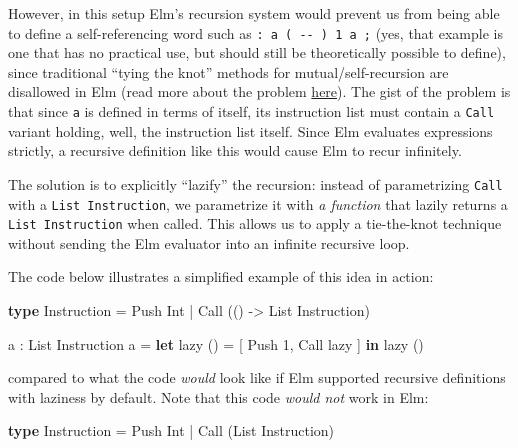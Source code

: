 \documentclass[
]{article}
\newenvironment{Shaded}{}{}
\newcommand{\DataTypeTok}[1]{\textcolor[rgb]{0.56,0.13,0.00}{#1}}
\newcommand{\DecValTok}[1]{\textcolor[rgb]{0.25,0.63,0.44}{#1}}
\newcommand{\FunctionTok}[1]{\textcolor[rgb]{0.02,0.16,0.49}{#1}}
\newcommand{\KeywordTok}[1]{\textcolor[rgb]{0.00,0.44,0.13}{\textbf{#1}}}
\newcommand{\NormalTok}[1]{#1}
\newcommand{\OperatorTok}[1]{\textcolor[rgb]{0.40,0.40,0.40}{#1}}
\begin{document}
\begin{itemize}
\begin{itemize}
\begin{itemize}
      However, in this setup Elm's recursion system would prevent us
      from being able to define a self-referencing word such as
      \texttt{:\ a\ (\ -\/-\ )\ 1\ a\ ;} (yes, that example is one that
      has no practical use, but should still be theoretically possible
      to define), since traditional ``tying the knot'' methods for
      mutual/self-recursion are disallowed in Elm (read more about the
      problem \href{https://elm-lang.org/0.19.1/bad-recursion}{here}).
      The gist of the problem is that since \texttt{a} is defined in
      terms of itself, its instruction list must contain a \texttt{Call}
      variant holding, well, the instruction list itself. Since Elm
      evaluates expressions strictly, a recursive definition like this
      would cause Elm to recur infinitely.

      The solution is to explicitly ``lazify'' the recursion: instead of
      parametrizing \texttt{Call} with a \texttt{List\ Instruction}, we
      parametrize it with \emph{a function} that lazily returns a
      \texttt{List\ Instruction} when called. This allows us to apply a
      tie-the-knot technique without sending the Elm evaluator into an
      infinite recursive loop.
    \end{itemize}

    The code below illustrates a simplified example of this idea in
    action:

\begin{Shaded}
\begin{Highlighting}[]
\KeywordTok{type} \DataTypeTok{Instruction} 
  \OperatorTok{=} \DataTypeTok{Push} \DataTypeTok{Int}
  \OperatorTok{|} \DataTypeTok{Call}\NormalTok{ (() }\OperatorTok{{-}\textgreater{}} \DataTypeTok{List} \DataTypeTok{Instruction}\NormalTok{)}

\FunctionTok{a}\NormalTok{ : }\DataTypeTok{List} \DataTypeTok{Instruction}
\FunctionTok{a} \OperatorTok{=} \KeywordTok{let} \FunctionTok{lazy}\NormalTok{ () }\OperatorTok{=}\NormalTok{ [ }\DataTypeTok{Push} \DecValTok{1}\OperatorTok{,} \DataTypeTok{Call} \FunctionTok{lazy}\NormalTok{ ] }\KeywordTok{in} \FunctionTok{lazy}\NormalTok{ ()}
\end{Highlighting}
\end{Shaded}

    compared to what the code \emph{would} look like if Elm supported
    recursive definitions with laziness by default. Note that this code
    \emph{would not} work in Elm:

\begin{Shaded}
\begin{Highlighting}[]
\KeywordTok{type} \DataTypeTok{Instruction}
  \OperatorTok{=} \DataTypeTok{Push} \DataTypeTok{Int}
  \OperatorTok{|} \DataTypeTok{Call}\NormalTok{ (}\DataTypeTok{List} \DataTypeTok{Instruction}\NormalTok{)}


\end{Highlighting}
\end{Shaded}
\end{itemize}
\end{itemize}
\end{document}
